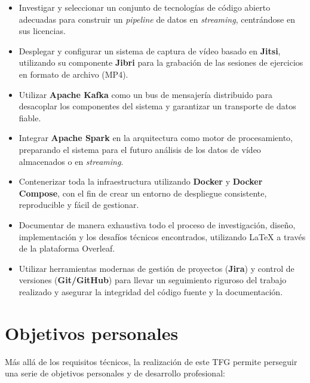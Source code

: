 \begin{itemize}
    \item Investigar y seleccionar un conjunto de tecnologías de código abierto adecuadas para construir un \textit{pipeline} de datos en \textit{streaming}, centrándose en sus licencias.
    
    \item Desplegar y configurar un sistema de captura de vídeo basado en \textbf{Jitsi}, utilizando su componente \textbf{Jibri} para la grabación de las sesiones de ejercicios en formato de archivo (MP4).
    
    \item Utilizar \textbf{Apache Kafka} como un bus de mensajería distribuido para desacoplar los componentes del sistema y garantizar un transporte de datos fiable.
    
    \item Integrar \textbf{Apache Spark} en la arquitectura como motor de procesamiento, preparando el sistema para el futuro análisis de los datos de vídeo almacenados o en \textit{streaming}.
    
    \item Contenerizar toda la infraestructura utilizando \textbf{Docker} y \textbf{Docker Compose}, con el fin de crear un entorno de despliegue consistente, reproducible y fácil de gestionar.
    
    \item Documentar de manera exhaustiva todo el proceso de investigación, diseño, implementación y los desafíos técnicos encontrados, utilizando \LaTeX{} a través de la plataforma Overleaf.
    
    \item Utilizar herramientas modernas de gestión de proyectos (\textbf{Jira}) y control de versiones (\textbf{Git/GitHub}) para llevar un seguimiento riguroso del trabajo realizado y asegurar la integridad del código fuente y la documentación.
    
\end{itemize}


\section{Objetivos personales}

Más allá de los requisitos técnicos, la realización de este TFG permite perseguir una serie de objetivos personales y de desarrollo profesional:

